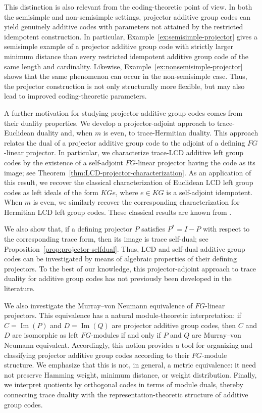 \documentclass[11pt]{article}
\begin{document}
This distinction is also relevant from the coding-theoretic point of view.
In both the semisimple and non-semisimple settings, projector additive group
codes can yield genuinely additive codes with parameters not attained by the
restricted idempotent construction. In particular,
Example~\ref{ex:semisimple-projector} gives a semisimple example of a
projector additive group code with strictly larger minimum distance than every
restricted idempotent additive group code of the same length and cardinality.
Likewise, Example~\ref{ex:nonsemisimple-projector} shows that the same
phenomenon can occur in the non-semisimple case. Thus, the projector
construction is not only structurally more flexible, but may also lead to
improved coding-theoretic parameters.


A further motivation for studying projector additive group codes comes from
their duality properties. We develop a projector-adjoint approach to
trace-Euclidean duality and, when $m$ is even, to trace-Hermitian duality.
This approach relates the dual of a projector additive group code to the
adjoint of a defining $FG$-linear projector. In particular, we characterize
trace-LCD additive left group codes by the existence of a self-adjoint
$FG$-linear projector having the code as its image; see
Theorem~\ref{thm:LCD-projector-characterization}. As an application of this
result, we recover the classical characterization of Euclidean LCD left group
codes as left ideals of the form $KGe$, where $e\in KG$ is a self-adjoint
idempotent. When $m$ is even, we similarly recover the corresponding
characterization for Hermitian LCD left group codes. These classical results
are known from \cite{CruzWillems2017,BBW24}.

We also show that, if a defining projector $P$ satisfies $P^*=I-P$ with
respect to the corresponding trace form, then its image is trace self-dual;
see Proposition~\ref{prop:projector-selfdual}. Thus, LCD and self-dual
additive group codes can be investigated by means of algebraic properties of
their defining projectors. To the best of our knowledge, this
projector-adjoint approach to trace duality for additive group codes has not
previously been developed in the literature.





We also investigate the Murray--von Neumann equivalence of $FG$-linear
projectors. This equivalence has a natural module-theoretic interpretation:
if $C=\operatorname{Im}(P)$ and $D=\operatorname{Im}(Q)$ are projector
additive group codes, then $C$ and $D$ are isomorphic as left $FG$-modules if
and only if $P$ and $Q$ are Murray--von Neumann equivalent. Accordingly,
this notion provides a tool for organizing and classifying projector
additive group codes according to their $FG$-module structure. We emphasize
that this is not, in general, a metric equivalence: it need not preserve
Hamming weight, minimum distance, or weight distribution. Finally, we
interpret quotients by orthogonal codes in terms of module duals, thereby
connecting trace duality with the representation-theoretic structure of
additive group codes.
\end{document}
